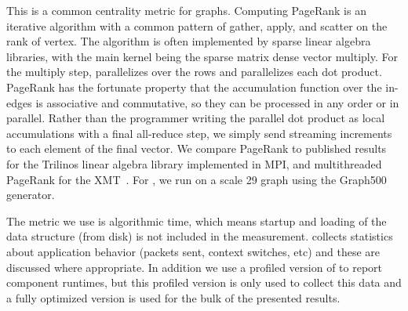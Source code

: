 \vspace{0.5ex}
 This is a common centrality metric for
graphs. Computing PageRank is an iterative algorithm with a common
pattern of gather, apply, and scatter on the rank of vertex. The algorithm
is often implemented by sparse linear algebra libraries, with the main
kernel being the sparse matrix dense vector multiply. For the multiply
step, \Grappa parallelizes over the rows and parallelizes each dot
product. PageRank has the fortunate property that the accumulation
function over the in-edges is associative and commutative, so they can
be processed in any order or in parallel. Rather than the programmer writing the
parallel dot product as local accumulations with a final all-reduce
step, we simply send streaming increments to each element of the final
vector. We compare PageRank to published results for the Trilinos linear algebra library implemented in MPI, and multithreaded PageRank for the XMT~\cite{MTGL:pagerank}.
For \Grappa, we run on a scale 29 graph using the Graph500 generator.

The metric we use is algorithmic time, which means startup and loading of the
data structure (from disk) is not included in the measurement. \Grappa
collects statistics about application behavior (packets sent, context
switches, etc) and these are discussed where appropriate. In addition we use a
profiled version of \Grappa to report component runtimes, but this profiled
version is only used to collect this data and a fully optimized version is
used for the bulk of the presented results.

